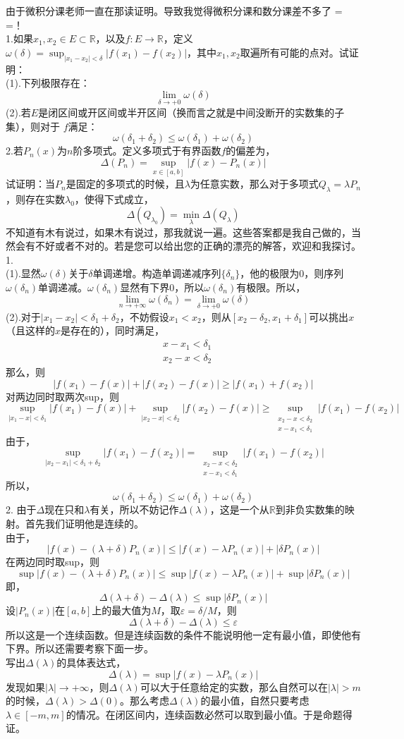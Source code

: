 \documentclass[11pt,a4paper,openany]{article}
\begin{document}
由于微积分课老师一直在那读证明。导致我觉得微积分课和数分课差不多了 = =！\\
1.如果$x_1,x_2 \in E \subset \mathbb{R}$，以及$f:E \rightarrow \mathbb{R}$，定义$\displaystyle{\omega(\delta) =\sup_{|x_1-x_2|<\delta}|f(x_1)-f(x_2)|}$，其中$x_1,x_2$取遍所有可能的点对。试证明：\\
(1).下列极限存在：
\[\lim_{\delta\rightarrow +0}\omega(\delta)\]
(2).若$E$是闭区间或开区间或半开区间（换而言之就是中间没断开的实数集的子集），则对于
$f$满足：
\[
\omega(\delta_1+\delta_2)
\leq \omega(\delta_1)+\omega(\delta_2)
\]
2.若$P_n(x)$为$n$阶多项式。定义多项式于有界函数$f$的偏差为，
\[
\Delta(P_n)=\sup_{x\in [a,b]}|f(x)-P_n(x)|
\]
试证明：当$P_n$是固定的多项式的时候，且$\lambda$为任意实数，那么对于多项式$Q_\lambda=\lambda P_n$，则存在实数$\lambda_0$，使得下式成立，
\[
\Delta(Q_{\lambda_0})=\min_{\lambda}\Delta(Q_{\lambda})
\]
\newpage
\noindent
不知道有木有说过，如果木有说过，那我就说一遍。这些答案都是我自己做的，当然会有不好或者不对的。若是您可以给出您的正确的漂亮的解答，欢迎和我探讨。\\ 
1.
\\(1).显然$\omega(\delta)$关于$\delta$单调递增。构造单调递减序列$\{\delta_n\}$，他的极限为0，则序列$\omega(\delta_n)$单调递减。$\omega(\delta_n)$显然有下界0，所以$\omega(\delta_n)$有极限。所以，
\[
\lim_{n\rightarrow +\infty}
\omega(\delta_n)=
\lim_{\delta\rightarrow +0}\omega(\delta)
\]
(2).对于$|x_1-x_2|<\delta_1+\delta_2$，不妨假设$x_1<x_2$，则从$[x_2-\delta_2,x_1+\delta_1]$可以挑出$x$（且这样的$x$是存在的），同时满足，
\[
\begin{split}
&x-x_1<\delta_1\\
&x_2-x<\delta_2
\end{split}
\]
那么，则
\[
|f(x_1)-f(x)|+|f(x_2)-f(x)|\geq |f(x_1)+f(x_2)|
\]
对两边同时取两次sup，则
\[
\sup_{|x_1-x|<\delta_1}|f(x_1)-f(x)|
+
\sup_{|x_2-x|<\delta_2}|f(x_2)-f(x)|
\geq \sup_{
\substack{x_2-x<\delta_2 
\\ 
x-x_1<\delta_1}}
|f(x_1)-f(x_2)|
\]
由于，
\[
\sup_{|x_2-x_1|<\delta_1+\delta_2}|f(x_1)-f(x_2)|=\sup_{
\substack{x_2-x<\delta_2 
\\ 
x-x_1<\delta_1}}
|f(x_1)-f(x_2)|
\]
所以，
\[
\omega(\delta_1+\delta_2)
\leq \omega(\delta_1)+\omega(\delta_2)
\]
2.
由于$\Delta$现在只和$\lambda$有关，所以不妨记作$\Delta(\lambda)$，这是一个从$\mathbb{R}$到非负实数集的映射。首先我们证明他是连续的。\\
由于，
\[
|f(x)-(\lambda+\delta)P_n(x)|
\leq |f(x)-\lambda P_n(x)|+|\delta P_n(x)|
\]
在两边同时取sup，则
\[
\sup |f(x)-(\lambda+\delta)P_n(x)|
\leq \sup |f(x)-\lambda P_n(x)|+\sup |\delta P_n(x)|
\]
即，
\[
\Delta(\lambda+\delta)
-\Delta(\lambda)
\leq
\sup|\delta P_n(x)|
\]
设$|P_n(x)|$在$[a,b]$上的最大值为$M$，取$\varepsilon=\delta/M$，则
\[
\Delta(\lambda+\delta)
-\Delta(\lambda)
\leq
\varepsilon
\]
所以这是一个连续函数。但是连续函数的条件不能说明他一定有最小值，即使他有下界。所以还需要考察下面一步。\\
\indent 写出$\Delta(\lambda)$的具体表达式，
\[
\Delta(\lambda)=\sup |f(x)-\lambda P_n(x)|
\]
发现如果$|\lambda| \rightarrow +\infty$，则$\Delta(\lambda)$可以大于任意给定的实数，那么自然可以在$|\lambda|>m$的时候，$\Delta(\lambda)>\Delta(0)$。那么考虑$\Delta(\lambda)$的最小值，自然只要考虑$\lambda \in [-m,m]$的情况。在闭区间内，连续函数必然可以取到最小值。于是命题得证。
\end{document}
